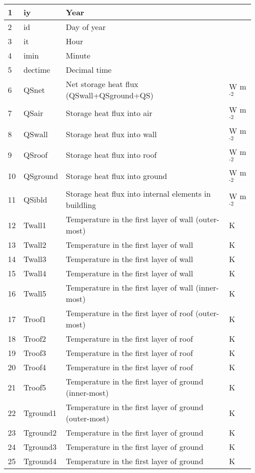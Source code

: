 \documentclass[letterpaper,10pt,english]{sphinxmanual}
\begin{document}
\begin{savenotes}
\begin{longtable}{|l|l|l|l|}
1
&
iy
&
Year
&\\
\hline
2
&
id
&
Day of year
&\\
\hline
3
&
it
&
Hour
&\\
\hline
4
&
imin
&
Minute
&\\
\hline
5
&
dectime
&
Decimal time
&\\
\hline
6
&
QSnet
&
Net storage heat flux (QSwall+QSground+QS)
&
W m$^{\text{-2}}$
\\
\hline
7
&
QSair
&
Storage heat flux into air
&
W m$^{\text{-2}}$
\\
\hline
8
&
QSwall
&
Storage heat flux into wall
&
W m$^{\text{-2}}$
\\
\hline
9
&
QSroof
&
Storage heat flux into roof
&
W m$^{\text{-2}}$
\\
\hline
10
&
QSground
&
Storage heat flux into ground
&
W m$^{\text{-2}}$
\\
\hline
11
&
QSibld
&
Storage heat flux into internal elements in buildling
&
W m$^{\text{-2}}$
\\
\hline
12
&
Twall1
&
Temperature in the first layer of wall (outer-most)
&
K
\\
\hline
13
&
Twall2
&
Temperature in the first layer of wall
&
K
\\
\hline
14
&
Twall3
&
Temperature in the first layer of wall
&
K
\\
\hline
15
&
Twall4
&
Temperature in the first layer of wall
&
K
\\
\hline
16
&
Twall5
&
Temperature in the first layer of wall (inner-most)
&
K
\\
\hline
17
&
Troof1
&
Temperature in the first layer of roof (outer-most)
&
K
\\
\hline
18
&
Troof2
&
Temperature in the first layer of roof
&
K
\\
\hline
19
&
Troof3
&
Temperature in the first layer of roof
&
K
\\
\hline
20
&
Troof4
&
Temperature in the first layer of roof
&
K
\\
\hline
21
&
Troof5
&
Temperature in the first layer of ground (inner-most)
&
K
\\
\hline
22
&
Tground1
&
Temperature in the first layer of ground (outer-most)
&
K
\\
\hline
23
&
Tground2
&
Temperature in the first layer of ground
&
K
\\
\hline
24
&
Tground3
&
Temperature in the first layer of ground
&
K
\\
\hline
25
&
Tground4
&
Temperature in the first layer of ground
&
K
\\

\end{longtable}
\end{savenotes}
\end{document}
